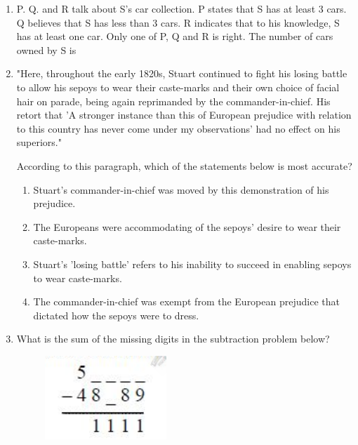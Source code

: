 \documentclass[journal]{IEEEtran}
\begin{document}
\begin{enumerate}[leftmargin=0pt]
    \item P. Q. and R talk about S's car collection. P states that S has at least 3 cars. Q believes that S has less than 3 cars. R indicates that to his knowledge, S has at least one car. Only one of P, Q and R is right. The number of cars owned by S is
    \begin{enumerate}
    \end{enumerate}

    \item "Here, throughout the early 1820s, Stuart continued to fight his losing battle to allow his sepoys to wear their caste-marks and their own choice of facial hair on parade, being again reprimanded by the commander-in-chief. His retort that 'A stronger instance than this of European prejudice with relation to this country has never come under my observations' had no effect on his superiors."

    According to this paragraph, which of the statements below is most accurate?
    \begin{enumerate}
            \item Stuart's commander-in-chief was moved by this demonstration of his prejudice.
            \item The Europeans were accommodating of the sepoys' desire to wear their caste-marks.
            \item Stuart's 'losing battle' refers to his inability to succeed in enabling sepoys to wear caste-marks.
            \item The commander-in-chief was exempt from the European prejudice that dictated how the sepoys were to dress.
    \end{enumerate}

    
    
    \item What is the sum of the missing digits in the subtraction problem below?
    \begin{figure}[h]
    \centering
    \includegraphics[width=0.2\columnwidth]{Figs/image (32).png}
    \caption*{}
    \label{fig:62}
    \end{figure}
   

\end{enumerate}
\end{document}
